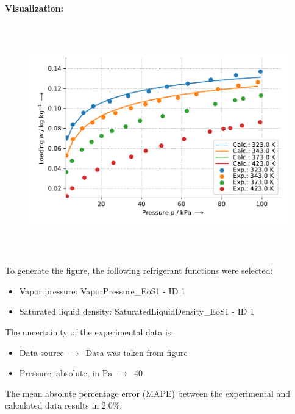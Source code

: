 \textbf{Visualization:}
%
\begin{figure}[!htp]
{\noindent\includegraphics[height=10cm, keepaspectratio]{figs/ads/ads_Propane_zeolite_crystal_5A_DubininAstakhov_1.pdf}}
\end{figure}
%

To generate the figure, the following refrigerant functions were selected:
\begin{itemize}
\item Vapor pressure: VaporPressure\_EoS1 - ID 1
\item Saturated liquid density: SaturatedLiquidDensity\_EoS1 - ID 1
\end{itemize}

The uncertainity of the experimental data is:
\begin{itemize}
\item Data source $\,\to\,$ Data was taken from figure
\item Pressure, absolute, in $\si{\pascal}$ $\,\to\,$ 40
\end{itemize}

The mean absolute percentage error (MAPE) between the experimental and calculated data results in 2.0\%.
\FloatBarrier
\newpage
